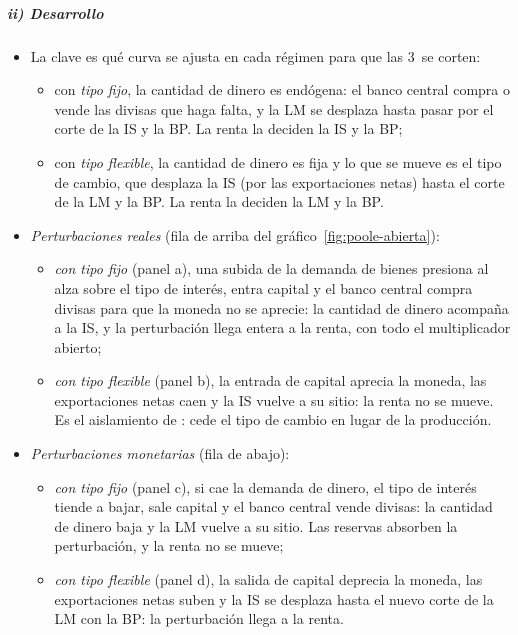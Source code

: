 \documentclass[11pt]{article}
\begin{document}
\subparagraph{ii) Desarrollo}

\begin{itemize}
\item La clave es qué curva se ajusta en cada régimen para que las 3~se corten:
  \begin{itemize}
  \item con \emph{tipo fijo}, la cantidad de dinero es endógena: el banco central compra o vende las divisas que haga falta, y la LM se desplaza hasta pasar por el corte de la IS y la BP. La renta la deciden la IS y la BP;
  \item con \emph{tipo flexible}, la cantidad de dinero es fija y lo que se mueve es el tipo de cambio, que desplaza la IS (por las exportaciones netas) hasta el corte de la LM y la BP. La renta la deciden la LM y la BP.
  \end{itemize}
\item \emph{Perturbaciones reales} (fila de arriba del gráfico~\ref{fig:poole-abierta}):
  \begin{itemize}
  \item \emph{con tipo fijo} (panel a), una subida de la demanda de bienes presiona al alza sobre el tipo de interés, entra capital y el banco central compra divisas para que la moneda no se aprecie: la cantidad de dinero acompaña a la IS, y la perturbación llega entera a la renta, con todo el multiplicador abierto;
  \item \emph{con tipo flexible} (panel b), la entrada de capital aprecia la moneda, las exportaciones netas caen y la IS vuelve a su sitio: la renta no se mueve. Es el aislamiento de \textcite{Friedman1953Case}: cede el tipo de cambio en lugar de la producción.
  \end{itemize}
\item \emph{Perturbaciones monetarias} (fila de abajo):
  \begin{itemize}
  \item \emph{con tipo fijo} (panel c), si cae la demanda de dinero, el tipo de interés tiende a bajar, sale capital y el banco central vende divisas: la cantidad de dinero baja y la LM vuelve a su sitio. Las reservas absorben la perturbación, y la renta no se mueve;
  \item \emph{con tipo flexible} (panel d), la salida de capital deprecia la moneda, las exportaciones netas suben y la IS se desplaza hasta el nuevo corte de la LM con la BP: la perturbación llega a la renta.
  \end{itemize}
\end{itemize}
\end{document}
